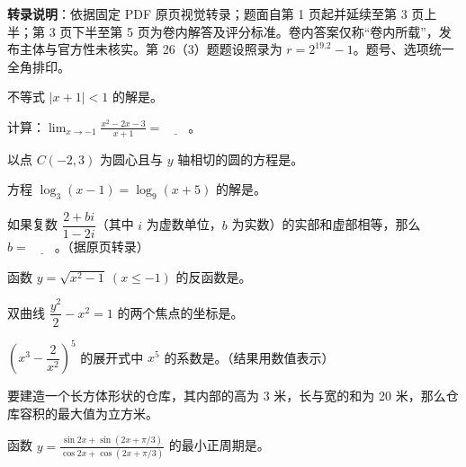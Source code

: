 

\begin{gktip}
\textbf{转录说明}：依据固定 PDF 原页视觉转录；题面自第 1 页起并延续至第 3 页上半；第 3 页下半至第 5 页为卷内解答及评分标准。卷内答案仅称“卷内所载”，发布主体与官方性未核实。第 26（3）题题设照录为 $r=2^{19.2}-1$。题号、选项统一全角排印。
\end{gktip}


\begin{question}
不等式 \(|x+1|<1\) 的解是\gkblank{}。

\end{question}
\begin{question}
计算：\(\displaystyle\lim_{x\to-1}\frac{x^2-2x-3}{x+1}=\underline{\qquad}\)。

\end{question}
\begin{question}
以点 \(C(-2,3)\) 为圆心且与 \(y\) 轴相切的圆的方程是\gkblank{}。

\end{question}
\begin{question}
方程 \(\log_3(x-1)=\log_9(x+5)\) 的解是\gkblank{}。

\end{question}
\begin{question}
如果复数 \(\dfrac{2+bi}{1-2i}\)（其中 \(i\) 为虚数单位，\(b\) 为实数）的实部和虚部相等，那么 \(b=\underline{\qquad}\)。（据原页转录）

\end{question}
\begin{question}
函数 \(y=\sqrt{x^2-1}\ (x\le-1)\) 的反函数是\gkblank{}。

\end{question}
\begin{question}
双曲线 \(\dfrac{y^2}{2}-x^2=1\) 的两个焦点的坐标是\gkblank{}。

\end{question}
\begin{question}
\(\left(x^3-\dfrac{2}{x^2}\right)^5\) 的展开式中 \(x^5\) 的系数是\gkblank{}。（结果用数值表示）

\end{question}
\begin{question}
要建造一个长方体形状的仓库，其内部的高为 3 米，长与宽的和为 20 米，那么仓库容积的最大值为\gkblank{}立方米。

\end{question}
\begin{question}
函数 \(\displaystyle y=\frac{\sin 2x+\sin(2x+\pi/3)}{\cos 2x+\cos(2x+\pi/3)}\) 的最小正周期是\gkblank{}。

\end{question}

